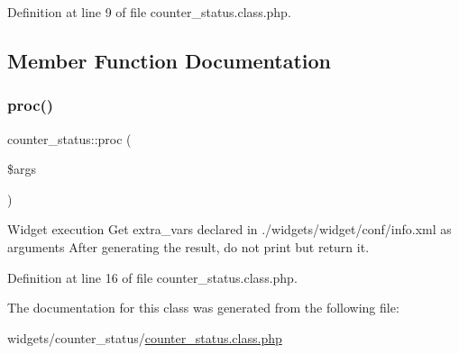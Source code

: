 Definition at line 9 of file counter\+\_\+status.\+class.\+php.



\subsection{Member Function Documentation}
\hypertarget{classcounter__status_a46c561f1ad22adcd158d48d90e19588a}{}\label{classcounter__status_a46c561f1ad22adcd158d48d90e19588a} 
\subsubsection{\texorpdfstring{proc()}{proc()}}
{\footnotesize\ttfamily counter\+\_\+status\+::proc (\begin{DoxyParamCaption}\item[{}]{\$args }\end{DoxyParamCaption})}



Widget execution Get extra\+\_\+vars declared in ./widgets/widget/conf/info.xml as arguments After generating the result, do not print but return it. 



Definition at line 16 of file counter\+\_\+status.\+class.\+php.



The documentation for this class was generated from the following file\+:\begin{DoxyCompactItemize}
\item 
widgets/counter\+\_\+status/\hyperlink{counter__status_8class_8php}{counter\+\_\+status.\+class.\+php}\end{DoxyCompactItemize}

